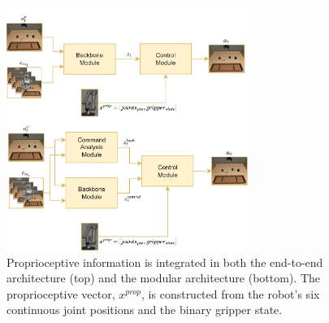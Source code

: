 \begin{figure}[t]
    \centering
    \includegraphics[width=0.7\textwidth]{figures/images/ch3/end_to_end_vs_modular_proprioceptive.jpg}
    \caption{Proprioceptive information is integrated in both the end-to-end architecture (top) and the modular architecture (bottom). The proprioceptive vector, $x^{prop}$, is constructed from the robot's six continuous joint positions and the binary gripper state.}
    \label{fig:end_to_end_vs_modular_proprioceptive}
\end{figure}
